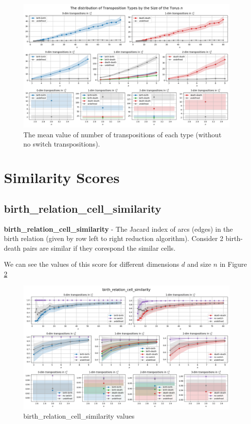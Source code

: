 \documentclass{article}
\begin{document}
\begin{figure}[h!]
    \centering
    \includegraphics[width=1.3\textwidth]{pics/torus-transpositions/switch-types (without no switch).png}
    \caption{The mean value of number of transpositions of each type (without no switch transpositions).}
    \label{fig:switch-without-noswitch}
\end{figure}



\section{Similarity Scores}
\subsection{birth\_relation\_cell\_similarity}
\par \textbf{birth\_relation\_cell\_similarity} - The Jacard index of arcs (edges) in the birth relation (given by row left to right reduction algorithm).
    Consider 2 birth-death pairs are similar if they corespond the similar cells.
\par We can see the values of this score for different dimensions $d$ and size $n$ in Figure \ref{fig:birth-relation-cell-similarity}

\begin{figure}[h!]
    \centering
    \includegraphics[width=1.3\textwidth]{pics/torus-transpositions/similaritites/score=birth-relation-cell-similarity.png}
    \caption{birth\_relation\_cell\_similarity values}
    \label{fig:birth-relation-cell-similarity}
\end{figure}
\end{document}

